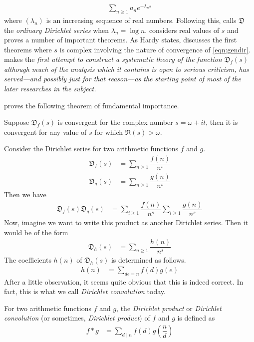 \documentclass[elemannt.tex]{subfile}
\begin{document}
		\begin{align}
			\sum_{n\geq 1}a_{n}e^{-\lambda_{n}s}\label{eqn:gendir}
		\end{align}
	where $(\lambda_{n})$ is an increasing sequence of real numbers. Following this, \textcite{hardy_riesz_1915} calls $\mathfrak{D}$ the \textit{ordinary Dirichlet series} when $\lambda_{n}=\log{n}$. \textcite{lejeune_1879} considers real values of $s$ and proves a number of important theorems. As Hardy states, \textcite{jensen_1884,jensen_1888} discusses the first theorems where $s$ is complex involving the nature of convergence of \ref{eqn:gendir}. \textcite{cahen_1894} makes the \textit{first attempt to construct a systematic theory of the function $\mathfrak{D}_{f}(s)$ although much of the analysis which it contains is open to serious criticism, has served---and possibly just for that reason---as the starting point of most of the later researches in the subject.}
		\begin{definition}[Convergence]
			
		\end{definition}
	\textcite{jensen_1884} proves the following theorem of fundamental importance.
		\begin{theorem}
			Suppose $\mathfrak{D}_{f}(s)$ is convergent for the complex number $s=\omega+it$, then it is convergent for any value of $s$ for which $\Re(s)>\omega$.
		\end{theorem}
	Consider the Dirichlet series for two arithmetic functions $f$ and $g$.
		\begin{align*}
			\mathfrak{D}_{f}(s)
				& = \sum_{n\geq 1}\dfrac{f(n)}{n^{s}}\\
			\mathfrak{D}_{g}(s)
				& = \sum_{n\geq 1}\dfrac{g(n)}{n^{s}}
		\end{align*}
	Then we have
		\begin{align*}
			\mathfrak{D}_{f}(s)\mathfrak{D}_{g}(s)
				& = \sum_{i\geq 1}\dfrac{f(n)}{n^{s}}\sum_{i\geq 1}\dfrac{g(n)}{n^{s}}
		\end{align*}
	Now, imagine we want to write this product as another Dirichlet series. Then it would be of the form
		\begin{align*}
			\mathfrak{D}_{h}(s)
				& = \sum_{n\geq 1}\dfrac{h(n)}{n^{s}}
		\end{align*}
	The coefficients $h(n)$ of $\mathfrak{D}_{h}(s)$ is determined as follows.
		\begin{align*}
			h(n)
				& = \sum_{de=n}f(d)g(e)
		\end{align*}
	After a little observation, it seems quite obvious that this is indeed correct. In fact, this is what we call  \textit{Dirichlet convolution} today.
		\begin{definition}
			For two arithmetic functions $f$ and $g$, the \textit{Dirichlet product} or \textit{Dirichlet convolution} (or sometimes, \textit{Dirichlet product}) of $f$ and $g$ is defined as
				\begin{align*}
					f\ast g
						& = \sum_{d\mid n}f(d)g\left(\dfrac{n}{d}\right)
				\end{align*}
		\end{definition}
	
\end{document}
